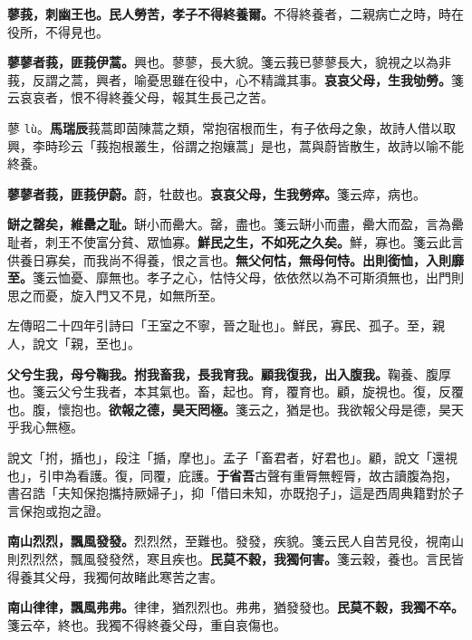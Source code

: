 \textbf{蓼莪，刺幽王也。民人勞苦，孝子不得終養爾。}{\footnotesize 不得終養者，二親病亡之時，時在役所，不得見也。}

\textbf{蓼蓼者莪，匪莪伊蒿。}{\footnotesize 興也。蓼蓼，長大貌。箋云莪已蓼蓼長大，貌視之以為非莪，反謂之蒿，興者，喻憂思雖在役中，心不精識其事。}\textbf{哀哀父母，生我劬勞。}{\footnotesize 箋云哀哀者，恨不得終養父母，報其生長己之苦。}

\begin{quoting}蓼 \texttt{lù}。\textbf{馬瑞辰}莪蒿即茵陳蒿之類，常抱宿根而生，有子依母之象，故詩人借以取興，李時珍云「莪抱根叢生，俗謂之抱孃蒿」是也，蒿與蔚皆散生，故詩以喻不能終養。\end{quoting}

\textbf{蓼蓼者莪，匪莪伊蔚。}{\footnotesize 蔚，牡菣也。}\textbf{哀哀父母，生我勞瘁。}{\footnotesize 箋云瘁，病也。}

\textbf{缾之罄矣，維罍之耻。}{\footnotesize 缾小而罍大。罄，盡也。箋云缾小而盡，罍大而盈，言為罍耻者，刺王不使富分貧、眾恤寡。}\textbf{鮮民之生，不如死之久矣。}{\footnotesize 鮮，寡也。箋云此言供養日寡矣，而我尚不得養，恨之言也。}\textbf{無父何怙，無母何恃。出則銜恤，入則靡至。}{\footnotesize 箋云恤憂、靡無也。孝子之心，怙恃父母，依依然以為不可斯須無也，出門則思之而憂，旋入門又不見，如無所至。}

\begin{quoting}左傳昭二十四年引詩曰「王室之不寧，晉之耻也」。鮮民，寡民、孤子。至，親人，說文「親，至也」。\end{quoting}

\textbf{父兮生我，母兮鞠我。拊我畜我，長我育我。顧我復我，出入腹我。}{\footnotesize 鞠養、腹厚也。箋云父兮生我者，本其氣也。畜，起也。育，覆育也。顧，旋視也。復，反覆也。腹，懷抱也。}\textbf{欲報之德，昊天罔極。}{\footnotesize 箋云之，猶是也。我欲報父母是德，昊天乎我心無極。}

\begin{quoting}說文「拊，揗也」，段注「揗，摩也」。孟子「畜君者，好君也」。顧，說文「還視也」，引申為看護。復，同覆，庇護。\textbf{于省吾}古聲有重脣無輕脣，故古讀腹為抱，書召誥「夫知保抱攜持厥婦子」，抑「借曰未知，亦既抱子」，這是西周典籍對於子言保抱或抱之證。\end{quoting}

\textbf{南山烈烈，飄風發發。}{\footnotesize 烈烈然，至難也。發發，疾貌。箋云民人自苦見役，視南山則烈烈然，飄風發發然，寒且疾也。}\textbf{民莫不穀，我獨何害。}{\footnotesize 箋云穀，養也。言民皆得養其父母，我獨何故睹此寒苦之害。}

\textbf{南山律律，飄風弗弗。}{\footnotesize 律律，猶烈烈也。弗弗，猶發發也。}\textbf{民莫不穀，我獨不卒。}{\footnotesize 箋云卒，終也。我獨不得終養父母，重自哀傷也。}

